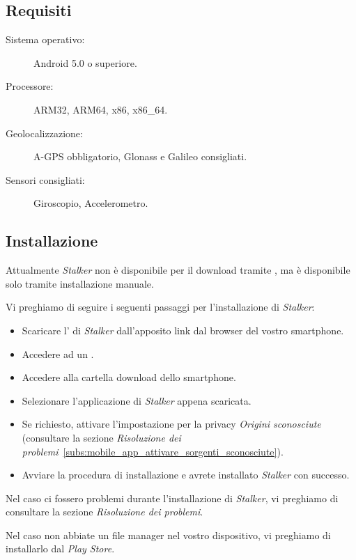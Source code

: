 \documentclass[../manuale-utente.tex]{subfiles}
\begin{document}
\subsection{Requisiti}%
\label{sub:mobile_app_requisiti}

\begin{description}
    \item[Sistema operativo:] Android 5.0 o superiore.
    \item[Processore:] ARM32, ARM64, x86, x86\_64.
    \item[Geolocalizzazione:] A-GPS obbligatorio, Glonass e Galileo consigliati.
    \item[Sensori consigliati:] Giroscopio, Accelerometro.
\end{description}

\subsection{Installazione}

Attualmente \textit{Stalker} non è disponibile per il download tramite , ma è disponibile solo tramite installazione manuale.

Vi preghiamo di seguire i seguenti passaggi per l'installazione di \textit{Stalker}:
\begin{itemize}
    \item Scaricare l' di \textit{Stalker} dall'apposito link dal browser del vostro smartphone.
    \item Accedere ad un .
    \item Accedere alla cartella download dello smartphone.
    \item Selezionare l'applicazione di \textit{Stalker} appena scaricata.
    \item Se richiesto, attivare l'impostazione per la privacy \textit{Origini sconosciute} (consultare la sezione \textit{Risoluzione dei problemi}~\ref{subs:mobile_app_attivare_sorgenti_sconosciute}).
    \item Avviare la procedura di installazione e avrete installato \textit{Stalker} con successo.
\end{itemize}

Nel caso ci fossero problemi durante l'installazione di \textit{Stalker}, vi preghiamo di consultare la sezione \textit{Risoluzione dei problemi}.

Nel caso non abbiate un file manager nel vostro dispositivo, vi preghiamo di installarlo dal \textit{Play Store}.
\newpage
\end{document}
